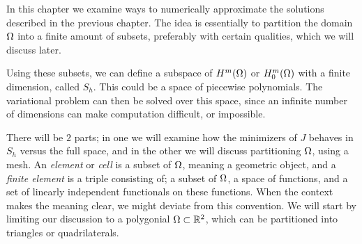 In this chapter we examine ways to numerically approximate the solutions described in the previous chapter.
The idea is essentially to partition the domain $\Omega$ into a finite amount 
of subsets, preferably with certain qualities, which we will discuss later. 

Using these subsets, we can define a subspace of $H^m(\Omega)$ or $H^m_0(\Omega)$ 
with a finite dimension, called $S_h$. 
This could be a space of piecewise polynomials. 
The variational problem can then be 
solved over this space, since an infinite number of dimensions can make 
computation difficult, or impossible.

There will be $2$ parts; in one we 
will examine how the minimizers of $J$ behaves in $S_h$ versus the full space, 
and in the other we will discuss partitioning $\Omega$, using a mesh.
An \emph{element} or \emph{cell} is a 
subset of $\Omega$, meaning a geometric object, 
and a \emph{finite element} is a 
triple consisting of; a subset of $\Omega$, a space of functions, and a set of 
linearly independent functionals on these functions.
When the context makes the meaning clear, we might deviate from 
this convention.
We will start by limiting our discussion to a polygonial $\Omega \subset \mathbb{R}^2$, which 
can be partitioned into triangles or quadrilaterals.